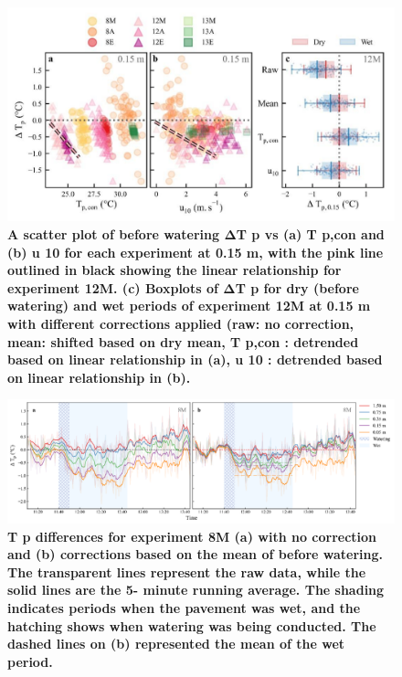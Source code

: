 \documentclass[final,3p,times,authoryear]{elsarticle}
\begin{document}
\begin{figure}
\centering
\includegraphics[trim={0 0 0 0},clip,scale=1.0]{pict011.jpg}
\caption{\bf A scatter plot of before watering ΔT p vs (a) T p,con and (b) u 10 for each experiment at 0.15 m,
with the pink line outlined in black showing the linear relationship for experiment 12M. (c) Boxplots of
ΔT p for dry (before watering) and wet periods of experiment 12M at 0.15 m with different corrections
applied (raw: no correction, mean: shifted based on dry mean, T p,con : detrended based on linear
relationship in (a), u 10 : detrended based on linear relationship in (b).}
 \label{fig:3.1}
\end{figure}


\begin{figure}
\centering
\includegraphics[trim={0 0 0 0},clip,scale=1.0]{pict013.png}
\caption{\bf T p differences for experiment 8M (a) with no correction and (b) corrections based on the
mean of before watering. The transparent lines represent the raw data, while the solid lines are the 5-
minute running average. The shading indicates periods when the pavement was wet, and the hatching
shows when watering was being conducted. The dashed lines on (b) represented the mean of the wet
period.}
 \label{fig:3.2}
\end{figure}
\end{document}
